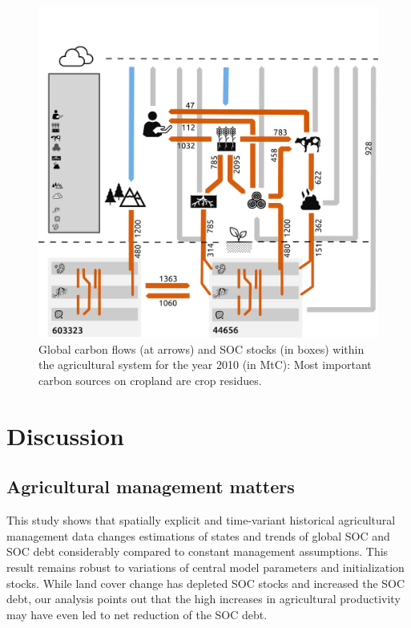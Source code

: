 \documentclass[gc, manuscript]{copernicus}
\begin{document}
\begin{figure}
\includegraphics[width=16cm]{../ResultNotebooks/Output/Images/CarbonBudget} \caption{Global carbon flows (at arrows) and SOC stocks (in boxes) within the agricultural system for the year 2010 (in MtC): Most important carbon sources on cropland are crop residues.}\label{fig:FlowFig}
\end{figure}

\newpage

\hypertarget{discussion}{%
\section{Discussion}\label{discussion}}

\hypertarget{agricultural-management-matters}{%
\subsection{Agricultural management matters}\label{agricultural-management-matters}}

This study shows that spatially explicit and time-variant historical agricultural management data changes estimations of states and trends of global SOC and SOC debt considerably compared to constant management assumptions. This result remains robust to variations of central model parameters and initialization stocks. While land cover change has depleted SOC stocks and increased the SOC debt, our analysis points out that the high increases in agricultural productivity may have even led to net reduction of the SOC debt.
\end{document}
